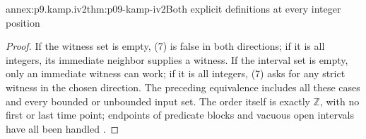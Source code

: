 \begin{annexitem}{annex:p9.kamp.iv2}{thm:p09-kamp-iv2}{Both explicit definitions at every integer position}
\begin{proof}
If the witness set is empty, (7) is false in both
directions; if it is all integers, its immediate
neighbor supplies a witness. If the interval set is
empty, only an immediate witness can work; if it is
all integers, (7) asks for any strict witness in the
chosen direction. The preceding equivalence includes
all these cases and every bounded or unbounded input
set. The order itself is exactly \(\mathbb Z\),
with no first or last time point; endpoints of predicate
blocks and vacuous open intervals have all been handled
\cite[ch.~IV, thm.~2, pp.~100--105]{Kamp1968}.
\end{proof}
\end{annexitem}
